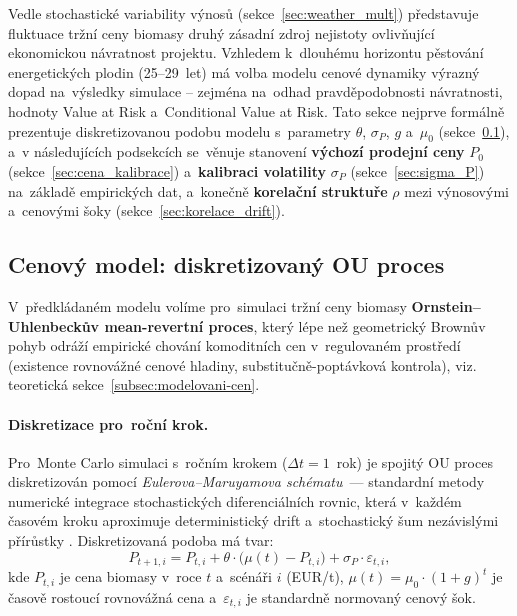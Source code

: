 Vedle stochastické variability výnosů (sekce~\ref{sec:weather_mult})
představuje fluktuace tržní ceny biomasy druhý zásadní zdroj nejistoty
ovlivňující ekonomickou návratnost projektu. Vzhledem k~dlouhému
horizontu pěstování energetických plodin (25--29~let) má volba modelu
cenové dynamiky výrazný dopad na~výsledky simulace -- zejména
na~odhad pravděpodobnosti návratnosti, hodnoty Value at Risk
a~Conditional Value at Risk. Tato sekce nejprve formálně prezentuje diskretizovanou podobu modelu
s~parametry $\theta$, $\sigma_P$, $g$ a~$\mu_0$
(sekce~\ref{sec:ou_diskretizace}), a~v následujících podsekcích
se~věnuje stanovení \textbf{výchozí prodejní ceny} $P_0$
(sekce~\ref{sec:cena_kalibrace}) a~\textbf{kalibraci volatility}
$\sigma_P$ (sekce~\ref{sec:sigma_P}) na~základě
empirických dat, a~konečně \textbf{korelační struktuře} $\rho$
mezi výnosovými a~cenovými šoky (sekce~\ref{sec:korelace_drift}).

\subsection{Cenový model: diskretizovaný OU proces}
\label{sec:ou_diskretizace}

V~předkládaném modelu volíme pro~simulaci tržní ceny biomasy
\textbf{Ornstein--Uhlenbeckův mean-revertní proces}, který lépe
než geometrický Brownův pohyb odráží empirické chování komoditních
cen v~regulovaném prostředí (existence rovnovážné cenové hladiny,
substitučně-poptávková kontrola), viz. teoretická sekce~\ref{subsec:modelovani-cen}.

\paragraph{Diskretizace pro~roční krok.}
Pro~Monte Carlo simulaci s~ročním krokem ($\Delta t = 1$~rok) je
spojitý OU proces diskretizován pomocí \emph{Eulerova--Maruyamova
schématu}~--- standardní metody numerické integrace stochastických
diferenciálních rovnic, která v~každém časovém kroku aproximuje
deterministický drift a~stochastický šum nezávislými přírůstky
\citep{KloedenPlaten1992,Glasserman2003}. Diskretizovaná podoba má
tvar:
\begin{equation}
    P_{t+1,i} = P_{t,i} + \theta \cdot \bigl( \mu(t) - P_{t,i} \bigr)
                + \sigma_P \cdot \varepsilon_{t,i},
    \label{eq:ou_diskretni}
\end{equation}
kde $P_{t,i}$ je cena biomasy v~roce $t$ a~scénáři $i$ (EUR/t),
$\mu(t) = \mu_0 \cdot (1 + g)^t$ je časově rostoucí rovnovážná cena
a~$\varepsilon_{t,i}$ je standardně normovaný cenový šok.


